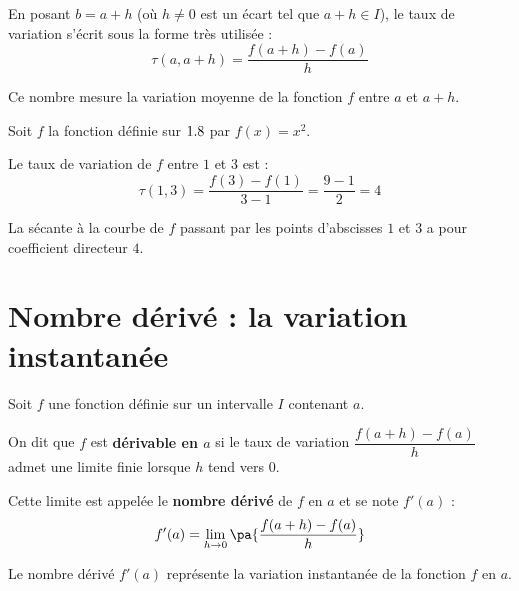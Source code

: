 En posant $b = a + h$ (où $h \neq 0$ est un écart tel que $a + h \in I$), le taux de variation s'écrit sous la forme très utilisée :
\[
	\tau(a,a+h) = \dfrac{f(a + h) - f(a)}{h}
\]

Ce nombre mesure la variation moyenne de la fonction $f$ entre $a$ et $a + h$.

\begin{ex}
	Soit $f$ la fonction définie sur $1.8$ par $f(x) = x^2$.

	Le taux de variation de $f$ entre $1$ et $3$ est :
	\[
		\tau(1, 3) = \dfrac{f(3) - f(1)}{3 - 1} = \dfrac{9 - 1}{2} = 4
	\]

	La sécante à la courbe de $f$ passant par les points d'abscisses $1$ et $3$ a pour coefficient directeur $4$.
\end{ex}

\section{Nombre dérivé : la variation instantanée}

\begin{defin}
	Soit $f$ une fonction définie sur un intervalle $I$ contenant $a$.

	On dit que $f$ est \textbf{dérivable en $a$} si le taux de variation $\dfrac{f(a + h) - f(a)}{h}$ admet une limite finie lorsque $h$ tend vers $0$.

	Cette limite est appelée le \textbf{nombre dérivé} de $f$ en $a$ et se note $f'(a)$ :
	\[
		f'(a) = \lim\limits_{h \to 0}\pa{\dfrac{f(a + h) - f(a)}{h}}
	\]

\end{defin}

\begin{rem}
	Le nombre dérivé $f'(a)$ représente la variation instantanée de la fonction $f$ en $a$.
\end{rem}

